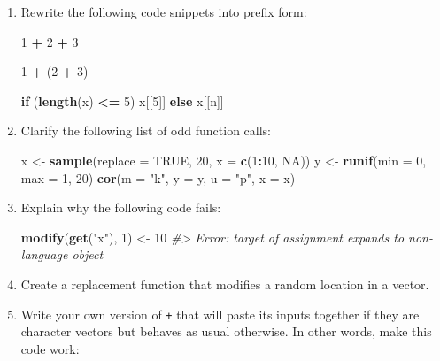\documentclass[]{book}
\newenvironment{Shaded}{\begin{snugshade}}{\end{snugshade}}
\newcommand{\KeywordTok}[1]{\textcolor[rgb]{0.13,0.29,0.53}{\textbf{#1}}}
\newcommand{\DataTypeTok}[1]{\textcolor[rgb]{0.13,0.29,0.53}{#1}}
\newcommand{\DecValTok}[1]{\textcolor[rgb]{0.00,0.00,0.81}{#1}}
\newcommand{\StringTok}[1]{\textcolor[rgb]{0.31,0.60,0.02}{#1}}
\newcommand{\CommentTok}[1]{\textcolor[rgb]{0.56,0.35,0.01}{\textit{#1}}}
\newcommand{\OtherTok}[1]{\textcolor[rgb]{0.56,0.35,0.01}{#1}}
\newcommand{\ControlFlowTok}[1]{\textcolor[rgb]{0.13,0.29,0.53}{\textbf{#1}}}
\newcommand{\OperatorTok}[1]{\textcolor[rgb]{0.81,0.36,0.00}{\textbf{#1}}}
\newcommand{\NormalTok}[1]{#1}
\theoremstyle{definition}
\theoremstyle{definition}
\theoremstyle{definition}
\theoremstyle{remark}
\begin{document}
\begin{enumerate}
\def\labelenumi{\arabic{enumi}.}
\item
  Rewrite the following code snippets into prefix form:

\begin{Shaded}
\begin{Highlighting}[]
\DecValTok{1} \OperatorTok{+}\StringTok{ }\DecValTok{2} \OperatorTok{+}\StringTok{ }\DecValTok{3}

\DecValTok{1} \OperatorTok{+}\StringTok{ }\NormalTok{(}\DecValTok{2} \OperatorTok{+}\StringTok{ }\DecValTok{3}\NormalTok{)}

\ControlFlowTok{if}\NormalTok{ (}\KeywordTok{length}\NormalTok{(x) }\OperatorTok{<=}\StringTok{ }\DecValTok{5}\NormalTok{) x[[}\DecValTok{5}\NormalTok{]] }\ControlFlowTok{else}\NormalTok{ x[[n]]}
\end{Highlighting}
\end{Shaded}
\item
  Clarify the following list of odd function calls:

\begin{Shaded}
\begin{Highlighting}[]
\NormalTok{x <-}\StringTok{ }\KeywordTok{sample}\NormalTok{(}\DataTypeTok{replace =} \OtherTok{TRUE}\NormalTok{, }\DecValTok{20}\NormalTok{, }\DataTypeTok{x =} \KeywordTok{c}\NormalTok{(}\DecValTok{1}\OperatorTok{:}\DecValTok{10}\NormalTok{, }\OtherTok{NA}\NormalTok{))}
\NormalTok{y <-}\StringTok{ }\KeywordTok{runif}\NormalTok{(}\DataTypeTok{min =} \DecValTok{0}\NormalTok{, }\DataTypeTok{max =} \DecValTok{1}\NormalTok{, }\DecValTok{20}\NormalTok{)}
\KeywordTok{cor}\NormalTok{(}\DataTypeTok{m =} \StringTok{"k"}\NormalTok{, }\DataTypeTok{y =}\NormalTok{ y, }\DataTypeTok{u =} \StringTok{"p"}\NormalTok{, }\DataTypeTok{x =}\NormalTok{ x)}
\end{Highlighting}
\end{Shaded}
\item
  Explain why the following code fails:

\begin{Shaded}
\begin{Highlighting}[]
\KeywordTok{modify}\NormalTok{(}\KeywordTok{get}\NormalTok{(}\StringTok{"x"}\NormalTok{), }\DecValTok{1}\NormalTok{) <-}\StringTok{ }\DecValTok{10}
\CommentTok{#> Error: target of assignment expands to non-language object}
\end{Highlighting}
\end{Shaded}
\item
  Create a replacement function that modifies a random location in a
  vector.
\item
  Write your own version of \texttt{+} that will paste its inputs
  together if they are character vectors but behaves as usual otherwise.
  In other words, make this code work:


\end{enumerate}
\end{document}
